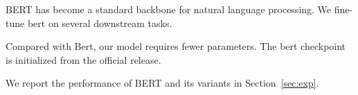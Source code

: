 BERT has become a standard backbone for natural language processing. We fine-tune bert on several downstream tasks.

Compared with Bert, our model requires fewer parameters. The bert checkpoint is initialized from the official release.

We report the performance of BERT and its variants in Section~\ref{sec:exp}.
